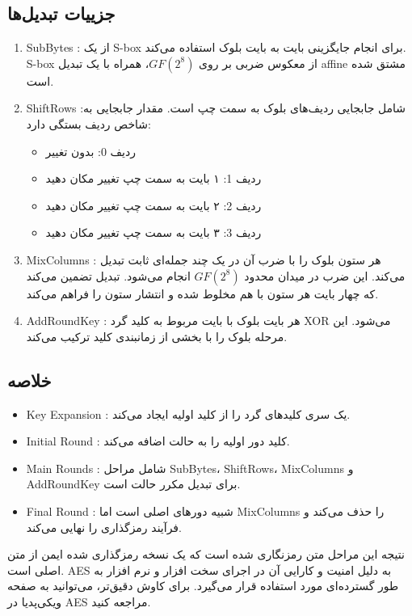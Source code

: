 \subsection*{جزییات تبدیل‌ها}
\begin{enumerate}
    \item SubBytes
    : از یک S-box برای انجام جایگزینی بایت به بایت بلوک استفاده می‌کند. S-box از معکوس ضربی بر روی \( GF(2^8) \)، همراه با یک تبدیل affine مشتق شده است.
    \item ShiftRows
    :شامل جابجایی ردیف‌های بلوک به سمت چپ است. مقدار جابجایی به شاخص ردیف بستگی دارد:
        \begin{itemize}
            \item ردیف 0: بدون تغییر
            \item ردیف 1: ۱ بایت به سمت چپ تغییر مکان دهید
            \item ردیف 2: ۲ بایت به سمت چپ تغییر مکان دهید
            \item ردیف 3: ۳ بایت به سمت چپ تغییر مکان دهید
        \end{itemize}
    \item MixColumns
    : هر ستون بلوک را با ضرب آن در یک چند جمله‌ای ثابت تبدیل می‌کند. این ضرب در میدان محدود \( GF(2^8) \) انجام می‌شود. تبدیل تضمین می‌کند که چهار بایت هر ستون با هم مخلوط شده و انتشار ستون را فراهم می‌کند.
    \item AddRoundKey
    : هر بایت بلوک با بایت مربوط به کلید گرد XOR می‌شود. این مرحله بلوک را با بخشی از زمانبندی کلید ترکیب می‌کند.
\end{enumerate}

\subsection*{خلاصه}
\begin{itemize}
    \item Key Expansion
    : یک سری کلیدهای گرد را از کلید اولیه ایجاد می‌کند.
    \item Initial Round
    : کلید دور اولیه را به حالت اضافه می‌کند.
    \item Main Rounds
    : شامل مراحل SubBytes، ShiftRows، MixColumns و AddRoundKey برای تبدیل مکرر حالت است.
    \item Final Round
    : شبیه دورهای اصلی است اما MixColumns را حذف می‌کند و فرآیند رمزگذاری را نهایی می‌کند.
\end{itemize}

نتیجه این مراحل متن رمزنگاری شده است که یک نسخه رمزگذاری شده ایمن از متن اصلی است. AES به دلیل امنیت و کارایی آن در اجرای سخت افزار و نرم افزار به طور گسترده‌ای مورد استفاده قرار می‌گیرد. برای کاوش دقیق‌تر، می‌توانید به صفحه ویکی‌پدیا در AES مراجعه کنید.

